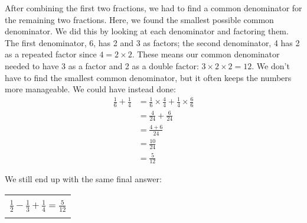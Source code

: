 {		After combining the first two fractions, we had to find a common denominator for the remaining two fractions. Here, we found the smallest possible common denominator. We did this by looking at each denominator and factoring them. The first denominator, 6, has 2 and 3 as factors; the second denominator, 4 has 2 as a repeated factor since $4=2\times2$. These means our common denominator needed to have 3 as a factor and 2 as a double factor: $3\times 2 \times 2 = 12$. We don't have to find the smallest common denominator, but it often keeps the numbers more manageable. We could have instead done:
		\begin{equation*}
			\begin{split}
				\frac{1}{6} + \frac{1}{4} & = \frac{1}{6} \times \frac{4}{4} + \frac{1}{4} \times \frac{6}{6} \\[6pt]
									& = \frac{4}{24} + \frac{6}{24} \\[6pt]
									& = \frac{4+6}{24} \\[6pt]
									& = \frac{10}{24} \\[6pt]
									& = \frac{5}{12}
			\end{split}
		\end{equation*}

		We still end up with the same final answer:


		\begin{center}
		\begin{tabular}{| c |} \hline
			\\[-4pt]
			$\displaystyle \frac{1}{2} - \frac{1}{3} + \frac{1}{4} = \frac{5}{12} $ \\[-4pt]
			\\\hline
		\end{tabular}
	\end{center}}\\

